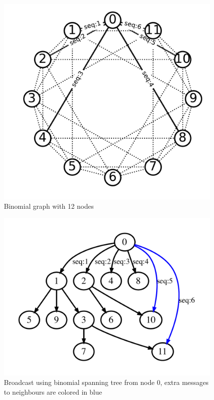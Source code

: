 \documentclass[sigconf]{acmart}
\begin{document}
\begin{figure}
  \centering
  \includegraphics[width=\linewidth]{BMG_seq.pdf}
  \caption{Binomial graph with 12 nodes}
\end{figure}
\begin{figure}
  \centering
  \includegraphics[width=\linewidth]{reorder_span.pdf}
  \caption{Broadcast using binomial spanning tree from node 0, extra messages to neighbours are colored in blue }
\end{figure}
\end{document}
